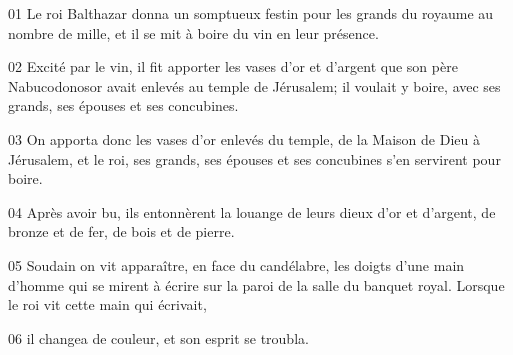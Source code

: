01 Le roi Balthazar donna un somptueux festin pour les grands du royaume au nombre de mille, et il se mit à boire du vin en leur présence.

02 Excité par le vin, il fit apporter les vases d’or et d’argent que son père Nabucodonosor avait enlevés au temple de Jérusalem; il voulait y boire, avec ses grands, ses épouses et ses concubines.

03 On apporta donc les vases d’or enlevés du temple, de la Maison de Dieu à Jérusalem, et le roi, ses grands, ses épouses et ses concubines s’en servirent pour boire.

04 Après avoir bu, ils entonnèrent la louange de leurs dieux d’or et d’argent, de bronze et de fer, de bois et de pierre.

05 Soudain on vit apparaître, en face du candélabre, les doigts d’une main d’homme qui se mirent à écrire sur la paroi de la salle du banquet royal. Lorsque le roi vit cette main qui écrivait,

06 il changea de couleur, et son esprit se troubla.